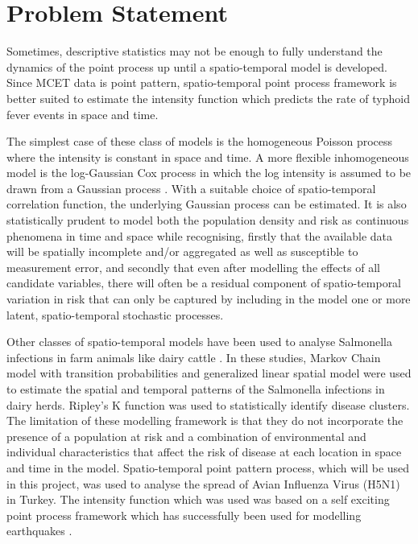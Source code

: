 \section{Problem Statement}

Sometimes, descriptive statistics may not be enough to fully understand the dynamics of the point process up until a spatio-temporal model is developed. Since MCET data is point pattern, spatio-temporal point process framework is better suited to estimate the intensity function which predicts the rate of typhoid fever events in space and time.

The simplest case of these class of models is the homogeneous Poisson process where the intensity is constant in space and time. A more flexible inhomogeneous model is the log-Gaussian Cox process in which the log intensity is assumed to be drawn from a Gaussian process \citep{Diggle:2013}. With a suitable choice of spatio-temporal correlation function, the underlying Gaussian process can be estimated. It is also statistically prudent to model both the population density and risk as continuous phenomena in time and space while recognising, firstly that the available data will be spatially incomplete and/or aggregated as well as susceptible to measurement error, and secondly that even after modelling the effects of all candidate variables, there will often be a residual component of spatio-temporal variation in risk that can only be captured by including in the model one or more latent, spatio-temporal stochastic processes.

Other classes of spatio-temporal models have been used to analyse Salmonella infections in farm animals like dairy cattle \citep{Fenton:2009, Cox:2012}. In these studies, Markov Chain model with transition probabilities and generalized linear spatial model were used to estimate the spatial and temporal patterns of the Salmonella infections in dairy herds. Ripley’s K function was used to statistically identify disease clusters. The limitation of these modelling framework is that they do not incorporate the presence of a population at risk and a combination of environmental and individual characteristics that affect the risk of disease at each location in space and time in the model. Spatio-temporal point pattern process, which will be used in this project, was used to analyse the spread of Avian Influenza Virus (H5N1) in Turkey. The intensity function which was used was based on a self exciting point process framework which has successfully been used for modelling earthquakes \citep{Kim:2011, Ogata:1998}.

